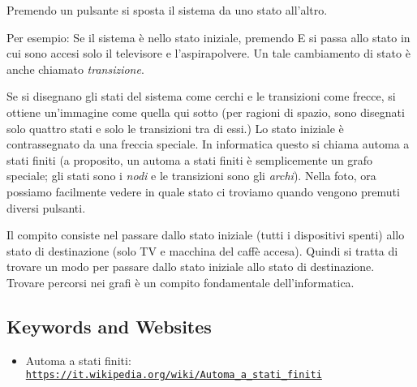 \documentclass[a4paper,11pt]{report}
\newcommand{\BrochureUrlText}[1]{\texttt{#1}}
\newcommand{\taskGraphicsFolder}{..}
\begin{document}
Premendo un pulsante si sposta il sistema da uno stato all’altro.

Per esempio: Se il sistema è nello stato iniziale, premendo E si passa allo stato in cui sono accesi solo il televisore e l’aspirapolvere. Un tale cambiamento di stato è anche chiamato \emph{transizione}.

Se si disegnano gli stati del sistema come cerchi e le transizioni come frecce, si ottiene un’immagine come quella qui sotto (per ragioni di spazio, sono disegnati solo quattro stati e solo le transizioni tra di essi.) Lo stato iniziale è contrassegnato da una freccia speciale. In informatica questo si chiama automa a stati finiti (a proposito, un automa a stati finiti è semplicemente un grafo speciale; gli stati sono i \emph{nodi} e le transizioni sono gli \emph{archi}). Nella foto, ora possiamo facilmente vedere in quale stato ci troviamo quando vengono premuti diversi pulsanti.

{\centering%
\par}

Il compito consiste nel passare dallo stato iniziale (tutti i dispositivi spenti) allo stato di destinazione (solo TV e macchina del caffè accesa). Quindi si tratta di trovare un modo per passare dallo stato iniziale allo stato di destinazione. Trovare percorsi nei grafi è un compito fondamentale dell’informatica.

{\raggedright

\subsection*{Keywords and Websites}

\begin{itemize}
  \item Automa a stati finiti: \href{https://it.wikipedia.org/wiki/Automa_a_stati_finiti}{\BrochureUrlText{https://it.wikipedia.org/wiki/Automa\_a\_stati\_finiti}}
\end{itemize}


}
\end{document}
